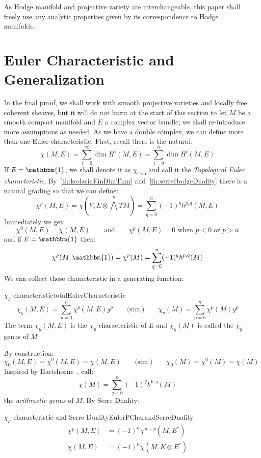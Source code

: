 \documentclass{book}
\newenvironment{Proof}[1][]
  {\begin{ProofTcb}[#1]}
  {\end{ProofTcb}}
\newcommand{\Top}{{\operatorname{Top}}}
\begin{document}
\begin{Proof}
 \cite[p.141]{hirzebruchTopologicalMethodsAlgebraic1995}
\end{Proof}


As Hodge manifold and projective variety are interchangeable, this paper shall freely use any analytic
properties given by its correspondence to Hodge manifolds.

\section{Euler Characteristic and Generalization}\label{sec:eulerCharAndGeneralization}

In the final proof, we shall work with smooth projective varieties and locally free coherent sheaves, but it
will do not harm at the start of this section to let $M$ be a smooth compact manifold and $E$ a complex vector
bundle; we shall re-introduce more assumptions as needed. As we have a double complex, we can define more than
one Euler characteristic. First, recall there is the natural:
\[
  \chi(M,E) = \sum_{i=0}^\infty \dim H^i(M,E) = \sum_{i=0}^n \dim H^i(M,E)
\]
If $E = \mathbbm{1}$, we shall denote it as $\chi_\Top$ and call it the \emph{Topological Euler
characteristic}. By~\cref{th:kodariaFinDimThm} and~\cref{th:serreHodgeDuality} there is a natural grading so
that we can define:
\[
  \chi^p(M,E) = \chi\left(V, E\otimes \bigwedge^p TM\right) = \sum_{q=0}^n (-1)^q h^{p,q}(M,E)
\]
Immediately we get:
\[
  \chi^0(M,E) = \chi(M,E) \qquad \text{and} \qquad \chi^p(M,E) = 0\text{ when $p < 0$ or $p > n$}
\]
and if $E = \mathbbm{1}$ then:
\[
  \chi^p(M,\mathbbm{1}) = \chi^p(M) = \sum_{q=0}^n (-1)^q h^{p,q}(M)
\]
We can collect these characteristic in a generating function:
\begin{defn}{$\chi_y$-characteristic}{totalEulerCharacteristic}
    \[
    \chi_y(M,E) = \sum_{p=0}^n \chi^p(M,E)y^p \qquad \text{(sim.)} \qquad \chi_y(M) = \sum_{p=0}^n \chi^p(M)y^p
  \]
  The term $\chi_y(M,E)$ is the $\chi_y$-characteristic of $E$ and $\chi_y(M)$ is called the $\chi_y$-genus of
  $M$
\end{defn}

By construction:
\[
  \chi_0(M,E) = \chi^0(M,E) = \chi(M,E) \qquad \text{(sim.)} \qquad \chi_0(M) = \chi^0(M) = \chi(M)
\]
Inspired by Hartshorne~\cite{hartshorneAlgebraicGeometry2013}, call:
\[
  \chi(M) = \sum_{q=0}^n (-1)^q h^{0,q}(M)
\]
the \emph{arithmetic genus} of $M$. By Serre Duality:
\begin{prop}{$\chi_p$-characteristic and Serre Duality}{EulerPCharandSerreDuality}
  \begin{align*}
  \chi^p(M,E) &= (-1)^n \chi^{n-p}(M, E^*)\\
  \chi(M,E)&= (-1)^n \chi(M, K\otimes E^*)
\end{align*}
\end{prop}
\end{document}

